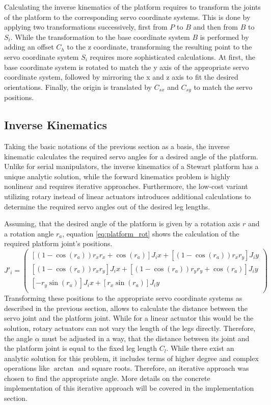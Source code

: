 Calculating the inverse kinematics of the platform requires to transform the
joints of the platform to the corresponding servo coordinate systems. This is
done by applying two transformations successively, first from $P$ to $B$ and
then from $B$ to $S_i$. While the transformation to the base coordinate system
$B$ is performed by adding an offset $C_h$ to the z coordinate, transforming
the resulting point to the servo coordinate system $S_i$ requires more
sophisticated calculations. At first, the base coordinate system is rotated to
match the y axis of the appropriate servo coordinate system, followed by
mirroring the x and z axis to fit the desired orientations. Finally, the
origin is translated by $C_{sx}$ and $C_{sy}$ to match the servo positions.

\subsection{Inverse Kinematics}
Taking the basic notations of the previous section as a basis, the inverse
kinematic calculates the required servo angles for a desired angle of the
platform. Unlike for serial manipulators, the inverse kinematics of a Stewart
platform has a unique analytic solution, while the forward kinematics problem
is highly nonlinear and requires iterative approaches. Furthermore, the
low-cost variant utilizing rotary instead of linear actuators introduces
additional calculations to determine the required servo angles out of the
desired leg lengths.

Assuming, that the desired angle of the platform is given by a rotation axis
$r$ and a rotation angle $r_a$, equation \ref{eq:platform_rot} shows the
calculation of the required platform joint's positions.
\begin{equation}
J'_i = 
\begin{pmatrix}
\left[\left(1 - \cos(r_a)\right) r_x r_x + \cos(r_a)\right] J_ix + \left[\left(1 - \cos(r_a)\right) r_x r_y\right] J_iy\\
\left[\left(1 - \cos(r_a)\right) r_x r_y\right] J_ix + \left[\left(1 - \cos(r_a)\right) r_y r_y + \cos(r_a)\right] J_iy\\
\left[-r_y \sin(r_a)\right] J_ix + \left[r_x \sin(r_a)\right] J_iy\\
\end{pmatrix}
\label{eq:platform_rot}
\end{equation}
Transforming these positions to the appropriate servo coordinate systems as
described in the previous section, allows to calculate the distance between
the servo joint and the platform joint. While for a linear actuator this would
be the solution, rotary actuators can not vary the length of the legs
directly. Therefore, the angle $\alpha$ must be adjusted in a way, that the
distance between its joint and the platform joint is equal to the fixed leg
length $C_l$. While there exist an analytic solution for this problem, it
includes terms of higher degree and complex operations like $\arctan$ and
square roots. Therefore, an iterative approach was chosen to find the
appropriate angle. More details on the concrete implementation of this
iterative approach will be covered in the implementation section.

